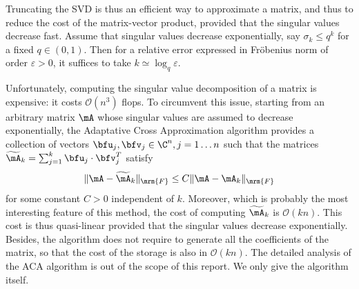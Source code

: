 Truncating the SVD is thus an efficient way to approximate a matrix, and thus to reduce the cost of the 
matrix-vector product, provided that  the singular values decrease fast. Assume that singular values decrease 
exponentially, say $\sigma_{k}\leq q^{k}$ for a fixed $q\in (0,1)$. Then for a relative error expressed in Fr\"obenius norm of order $\varepsilon>0$,  
it suffices to take $k \simeq \log_q \varepsilon$. 

\bigskip
Unfortunately, computing the singular value decomposition  of a matrix is expensive: it costs $\mathcal{O}(n^{3})$ flops. To circumvent this issue, starting from 
an arbitrary matrix $\mA$ whose singular values are assumed to decrease exponentially, the Adaptative 
Cross Approximation algorithm provides a collection of vectors $\bfu_{j},\bfv_{j}\in \C^{n}, j=1\dots n$ such that 
the matrices $\widetilde{\mA}_{k} = \sum_{j=1}^{k}\bfu_{j}\cdot\bfv_{j}^{T}$ satisfy 
$$
\Vert \mA - \widetilde{\mA}_{k}\Vert_{\mrm{F}}\leq C \Vert \mA - \mA_{k}\Vert_{\mrm{F}}
$$
for some constant $C>0$ independent of $k$. Moreover, which is probably the most interesting feature of this method, 
the cost of computing $\widetilde{\mA}_{k}$ is $\mathcal{O}(kn)$. This cost is thus quasi-linear provided that the singular 
values  decrease exponentially. Besides, the algorithm does not require to generate all the coefficients of the matrix, so that the cost of the storage is also in $\mathcal{O}(kn)$. The detailed analysis of the ACA algorithm is out of the scope of this report. We only 
give the algorithm itself.

